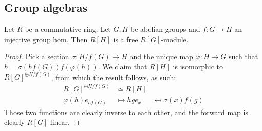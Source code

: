 \subsection{Group algebras}


\begin{proposition}
  \label{0-grp-alg-free}
  \uses{}

  Let $R$ be a commutative ring.
  Let $G, H$ be abelian groups and $f : G \to H$ an injective group hom.
  Then $R[H]$ is a free $R[G]$-module.
\end{proposition}
\begin{proof}
  \uses{}

  Pick a section $\sigma : H / f(G) \to H$ and the unique map $\varphi : H \to G$
  such that $h = \sigma(h f(G)) f(\varphi(h))$.
  We claim that $R[H]$ is isomorphic to $R[G]^{\oplus H / f(G)}$, from which the result follows,
  as such:
  \begin{align*}
    R[G]^{\oplus H / f(G)} & \simeq R[H] \\
    \varphi(h) e_{h f(G)} & \mapsto h
    g e_x & \mapsfrom \sigma(x) f(g)
  \end{align*}
  Those two functions are clearly inverse to each other,
  and the forward map is clearly $R[G]$-linear.
\end{proof}


